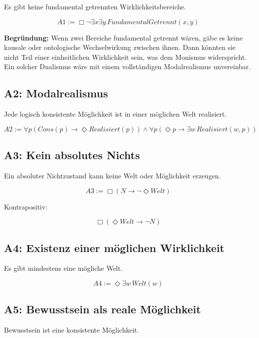 \documentclass[
]{article}
\begin{document}
Es gibt keine fundamental getrennten Wirklichkeitsbereiche.

\[
\boxed{A1 := \Box\neg\exists x\exists y\, FundamentalGetrennt(x,y)}
\]

\textbf{Begründung:} Wenn zwei Bereiche fundamental getrennt wären, gäbe es keine kausale oder ontologische Wechselwirkung zwischen ihnen. Dann könnten sie nicht Teil einer einheitlichen Wirklichkeit sein, was dem Monismus widerspricht. Ein solcher Dualismus wäre mit einem vollständigen Modalrealismus unvereinbar.

\subsection{A2: Modalrealismus}\label{a2-modalrealismus}

Jede logisch konsistente Möglichkeit ist in einer möglichen Welt realisiert.

\[
\boxed{A2 := \forall p(Cons(p) \rightarrow \Diamond Realisiert(p)) \land \forall p(\Diamond p \rightarrow \exists w\, Realisiert(w,p))}
\]

\subsection{A3: Kein absolutes Nichts}\label{a3-kein-absolutes-nichts}

Ein absoluter Nichtzustand kann keine Welt oder Möglichkeit erzeugen.

\[
\boxed{A3 := \Box(N \rightarrow \neg\Diamond Welt)}
\]

Kontrapositiv:

\[
\Box(\Diamond Welt \rightarrow \neg N)
\]

\subsection{A4: Existenz einer möglichen Wirklichkeit}\label{a4-existenz-einer-moumlglichen-wirklichkeit}

Es gibt mindestens eine mögliche Welt.

\[
\boxed{A4 := \Diamond\exists w\, Welt(w)}
\]

\subsection{A5: Bewusstsein als reale Möglichkeit}\label{a5-bewusstsein-als-reale-moumlglichkeit}

Bewusstsein ist eine konsistente Möglichkeit.
\end{document}
